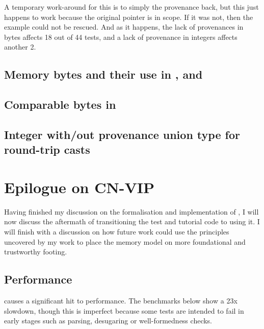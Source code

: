 A temporary work-around for this is to simply  the
provenance back, but this just happens to work because the original pointer is
in scope. If it was not, then the example could not be rescued. And as it
happens, the lack of provenances in bytes affects 18 out of 44 tests, and a
lack of provenance in integers affects another 2.


\section{Memory bytes and their use in , 
and }

\section{Comparable bytes in }

\section{Integer with/out provenance union type for round-trip casts}

\chapter{Epilogue on CN-VIP}

Having finished my discussion on the formalisation and implementation of
, I will now discuss the aftermath of transitioning the  test
and tutorial code to using it. I will finish with a discussion on how future
work could use the principles uncovered by my work to place the  memory
model on more foundational and trustworthy footing.

\section{Performance}

 causes a significant hit to performance. The benchmarks below show
a 2\textendash{}3x slowdown, though this is imperfect because some tests are intended to
fail in early stages such as parsing, desugaring or well-formedness checks.

